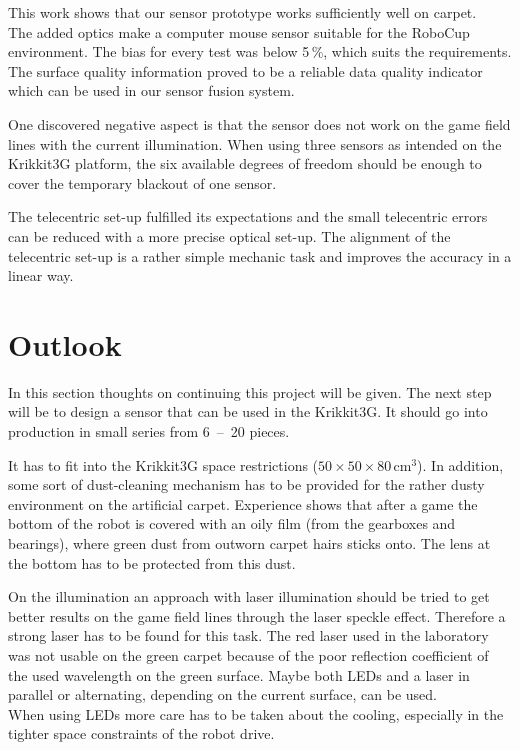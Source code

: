\documentclass[12pt,a4paper]{article}
\begin{document}
This work shows that our sensor prototype works sufficiently well on carpet.\\
The added optics make a computer mouse sensor suitable for the RoboCup environment.
The bias for every test was below 5\,\%, which suits the requirements.
The surface quality information proved to be a reliable data quality indicator which can be used in our sensor fusion system.

One discovered negative aspect is that the sensor does not work on the game field lines with the current illumination.
When using three sensors as intended on the Krikkit3G platform, the six available degrees of freedom should be enough to cover the temporary blackout of one sensor.

The telecentric set-up fulfilled its expectations and the small telecentric errors can be reduced with a more precise optical set-up.
The alignment of the telecentric set-up is a rather simple mechanic task and improves the accuracy in a linear way.

\clearpage
\section{Outlook}

In this section thoughts on continuing this project will be given.
The next step will be to design a sensor that can be used in the Krikkit3G.
It should go into production in small series from 6~--~20 pieces.

It has to fit into the Krikkit3G space restrictions ($50\times50\times80$\,cm$^3$).
In addition, some sort of dust-cleaning mechanism has to be provided for the rather dusty environment on the artificial carpet.
Experience shows that after a game the bottom of the robot is covered with an oily film (from the gearboxes and bearings), where green dust from outworn carpet hairs sticks onto.
The lens at the bottom has to be protected from this dust.

On the illumination an approach with laser illumination should be tried to get better results on the game field lines through the laser speckle effect.
Therefore a strong laser has to be found for this task.
The red laser used in the laboratory was not usable on the green carpet because of the poor reflection coefficient of the used wavelength on  the green surface.
Maybe both LEDs and a laser in parallel or alternating, depending on the current surface, can be used.\\
When using LEDs more care has to be taken about the cooling, especially in the tighter space constraints of the robot drive.
\end{document}
